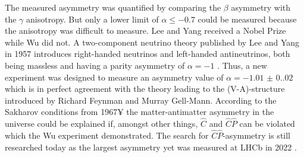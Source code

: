 The measured asymmetry was quantified by comparing the $\beta$ asymmetry with the $\gamma$ anisotropy. %
But only a lower limit of $\alpha\leq -0.7$ could be measured because the anisotropy was difficult to measure.
Lee and Yang received a Nobel Prize while Wu did not.
A two-component neutrino theory published by Lee and Yang in 1957 introduces right-handed neutrinos and left-handed antineutrinos, both being massless and having a parity asymmetry of $\alpha=-1$ \cite{PhysRev.105.1671}.
Thus, a new experiment was designed to measure an asymmetry value of $\alpha=\num{-1.01(0.02)}$ \cite{CHIROVSKY1980127} which is in perfect agreement with the theory leading to the (V-A)-structure introduced by Richard Feynman and Murray Gell-Mann.
According to the Sakharov conditions from 1967¥ \cite{Gato-Rivera} the matter-antimatter asymmetry in the universe could be explained if, amongst other things, $\hat C$ and $\hat C\hat P$ can be violated which the Wu experiment demonstrated.
The search for $\hat C\hat P$-asymmetry is still researched today as the largest asymmetry yet was measured at LHCb in 2022 \cite{AntiSymmetryLHC}.